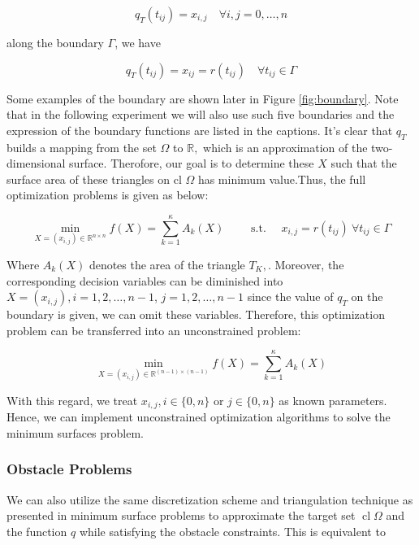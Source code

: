 \begin{equation}
    q_{T}\left(t_{i j}\right)=x_{i, j} \quad \forall i, j=0, \ldots, n
\end{equation}

along the boundary $\Gamma$, we have 

\begin{equation}
q_{T}\left(t_{i j}\right)=x_{i j}=r\left(t_{i j}\right) \quad \forall t_{i j} \in \Gamma
\end{equation}

Some examples of the boundary are shown later in Figure \ref{fig:boundary}. Note that in the following experiment we will also use such five boundaries and the expression of the boundary functions are listed in the captions. It's clear that $q_{T}$ builds a mapping from the set $\Omega$ to $\mathbb{R},$ which is an approximation of the two-dimensional surface.
Therofore, our goal is to determine these $X$ such that the surface area of these triangles on cl $\Omega$ has minimum value.Thus, the full optimization problems is given as below:

\begin{equation}
\min _{X=\left(x_{i, j}\right) \in \mathbb{R}^{n \times n}} f(X)=\sum_{k=1}^{\kappa} A_{k}(X) \qquad \text { s.t. } \quad x_{i, j}=r\left(t_{i j}\right) \ \forall t_{i j} \in \Gamma
\end{equation}

Where $A_{k}(X)$ denotes the area of the triangle $T_{K},$. Moreover, the corresponding decision variables can be diminished into $X=\left(x_{i, j}\right), i=1,2, \ldots, n-1$, $j=1,2, \ldots, n-1$
since the value of $q_{T}$ on the boundary is given, we can omit these variables. Therefore, this optimization problem can be transferred into an unconstrained problem:

\begin{equation}
\min _{X=\left(x_{i, j}\right) \in \mathbb{R}^{(n-1) \times(n-1)}} f(X)=\sum_{k=1}^{\kappa} A_{k}(X)
\end{equation}

With this regard, we treat $x_{i, j}, i \in\{0, n\}$ or $j \in\{0, n\}$ as known parameters. Hence, we can implement unconstrained optimization algorithms to solve the minimum surfaces problem.
\subsubsection{Obstacle Problems}
We can also utilize the same discretization scheme and triangulation technique as presented in minimum surface problems to approximate the target set $\operatorname{cl} \Omega$ and the function $q$ while satisfying the obstacle constraints. This is equivalent to 

